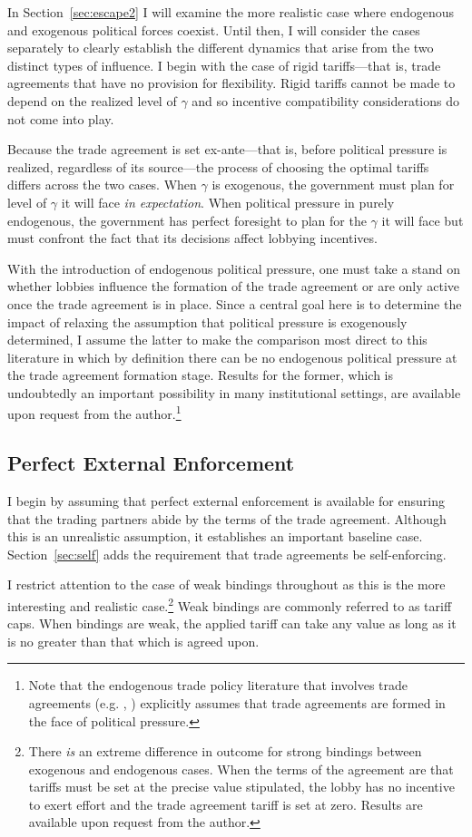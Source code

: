 \documentclass[12pt]{article}
\newcommand{\ga}{\gamma}
\begin{document}
In Section~\ref{sec:escape2} I will examine the more realistic case where endogenous and exogenous political forces coexist. Until then, I will consider the cases separately to clearly establish the different dynamics that arise from the two distinct types of influence. I begin with the case of rigid tariffs---that is, trade agreements that have no provision for flexibility. Rigid tariffs cannot be made to depend on the realized level of $\ga$ and so incentive compatibility considerations do not come into play.

Because the trade agreement is set ex-ante---that is, before political pressure is realized, regardless of its source---the process of choosing the optimal tariffs differs across the two cases. When $\ga$ is exogenous, the government must plan for level of $\ga$ it will face \textit{in expectation}. When political pressure in purely endogenous, the government has perfect foresight to plan for the $\ga$ it will face but must confront the fact that its decisions affect lobbying incentives.

With the introduction of endogenous political pressure, one must take a stand on whether lobbies influence the formation of the trade agreement or are only active once the trade agreement is in place. Since a central goal here is to determine the impact of relaxing the assumption that political pressure is exogenously determined, I assume the latter to make the comparison most direct to this literature in which by definition there can be no endogenous political pressure at the trade agreement formation stage. Results for the former, which is undoubtedly an important possibility in many institutional settings, are available upon request from the author.\footnote{Note that the endogenous trade policy literature that involves trade agreements (e.g. \Textcite{gh95}, \Textcite{mrc2007}) explicitly assumes that trade agreements are formed in the face of political pressure.}


\subsection{Perfect External Enforcement}
\label{sec:perfect}
I begin by assuming that perfect external enforcement is available for ensuring that the trading partners abide by the terms of the trade agreement. Although this is an unrealistic assumption, it establishes an important baseline case. Section~\ref{sec:self} adds the requirement that trade agreements be self-enforcing.

I restrict attention to the case of weak bindings throughout as this is the more interesting and realistic case.\footnote{There \textit{is} an extreme difference in outcome for strong bindings between exogenous and endogenous cases. When the terms of the agreement are that tariffs must be set at the precise value stipulated, the lobby has no incentive to exert effort and the trade agreement tariff is set at zero. Results are available upon request from the author.} Weak bindings are commonly referred to as tariff caps. When bindings are weak, the applied tariff can take any value as long as it is no greater than that which is agreed upon.
\end{document}
